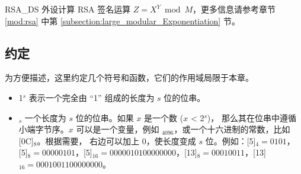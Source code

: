 \documentclass[main\_\_CN.tex]{subfiles}
\begin{document}
RSA\_DS 外设计算 RSA 签名运算 \begin{math}Z = X^{Y} \bmod M\end{math}，更多信息请参考章节 \ref{mod:rsa} \textit{}中第 \ref{subsection:large_modular_Exponentiation} 节\textit{}。

\subsection{约定}
为方便描述，这里约定几个符号和函数，它们的作用域局限于本章。

\begin{itemize}
\item
1\begin{math}^s\end{math}
\hspace{0.75cm}
表示一个完全由 “1” 组成的长度为 \begin{math}s\end{math} 位的位串。

\item
    \begin{math}[x]_{s}\end{math}  \hspace{0.5cm}
       一个长度为 \begin{math}s\end{math} 位的位串。如果 \begin{math}x\end{math} 是一个数 (\begin{math}x\end{math} < 2\begin{math}^s\end{math})， 那么其在位串中遵循小端字节序。\begin{math}x\end{math} 可以是一个变量，例如 \begin{math}[Y]_{4096}\end{math}，或一个十六进制的常数，比如 [\hexprefix{}0C]\begin{math}_{8}\end{math}。根据需要，\begin{math}[x]\end{math} 右边可以加上 0，使长度变成 \begin{math}s\end{math} 位。例如：[\hexprefix{}5]\begin{math}_{4} = 0101\end{math}，[\hexprefix{}5]\begin{math}_{8} = 00000101\end{math}，[\hexprefix{}5]\begin{math}_{16} = 00000101 00000000\end{math}，[\hexprefix{}13]\begin{math}_{8} = 00010011\end{math}，[\hexprefix{}13]\begin{math}_{16} = 00010011 00000000\end{math}。



\end{itemize}
\end{document}
